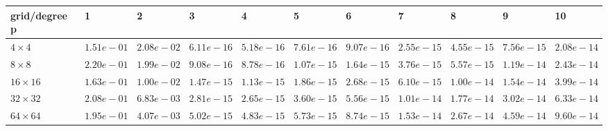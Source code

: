 \begin{tabular}{lllllllllll}
\hline
 grid/degree p   & 1          & 2          & 3          & 4          & 5          & 6          & 7          & 8          & 9          & 10         \\
\hline
 $4 \times 4$    & $1.51e-01$ & $2.08e-02$ & $6.11e-16$ & $5.18e-16$ & $7.61e-16$ & $9.07e-16$ & $2.55e-15$ & $4.55e-15$ & $7.56e-15$ & $2.08e-14$ \\
 $8 \times 8$    & $2.20e-01$ & $1.99e-02$ & $9.08e-16$ & $8.78e-16$ & $1.07e-15$ & $1.64e-15$ & $3.76e-15$ & $5.57e-15$ & $1.19e-14$ & $2.43e-14$ \\
 $16 \times 16$  & $1.63e-01$ & $1.00e-02$ & $1.47e-15$ & $1.13e-15$ & $1.86e-15$ & $2.68e-15$ & $6.10e-15$ & $1.00e-14$ & $1.54e-14$ & $3.99e-14$ \\
 $32 \times 32$  & $2.08e-01$ & $6.83e-03$ & $2.81e-15$ & $2.65e-15$ & $3.60e-15$ & $5.56e-15$ & $1.01e-14$ & $1.77e-14$ & $3.02e-14$ & $6.33e-14$ \\
 $64 \times 64$  & $1.95e-01$ & $4.07e-03$ & $5.02e-15$ & $4.83e-15$ & $5.73e-15$ & $8.74e-15$ & $1.53e-14$ & $2.67e-14$ & $4.59e-14$ & $9.60e-14$ \\
\hline
\end{tabular}